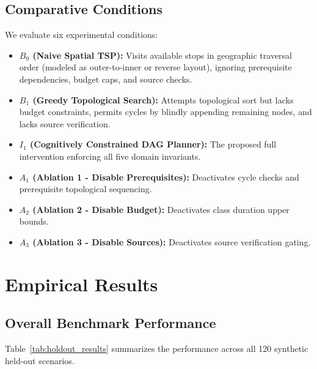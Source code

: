 \documentclass[11pt,a4paper]{article}
\begin{document}
\subsection{Comparative Conditions}
We evaluate six experimental conditions:
\begin{itemize}
    \item \textbf{$B_0$ (Naive Spatial TSP):} Visits available stops in geographic traversal order (modeled as outer-to-inner or reverse layout), ignoring prerequisite dependencies, budget caps, and source checks.
    \item \textbf{$B_1$ (Greedy Topological Search):} Attempts topological sort but lacks budget constraints, permits cycles by blindly appending remaining nodes, and lacks source verification.
    \item \textbf{$I_1$ (Cognitively Constrained DAG Planner):} The proposed full intervention enforcing all five domain invariants.
    \item \textbf{$A_1$ (Ablation 1 - Disable Prerequisites):} Deactivates cycle checks and prerequisite topological sequencing.
    \item \textbf{$A_2$ (Ablation 2 - Disable Budget):} Deactivates class duration upper bounds.
    \item \textbf{$A_3$ (Ablation 3 - Disable Sources):} Deactivates source verification gating.
\end{itemize}

\section{Empirical Results}

\subsection{Overall Benchmark Performance}
Table~\ref{tab:holdout_results} summarizes the performance across all 120 synthetic held-out scenarios.
\end{document}
